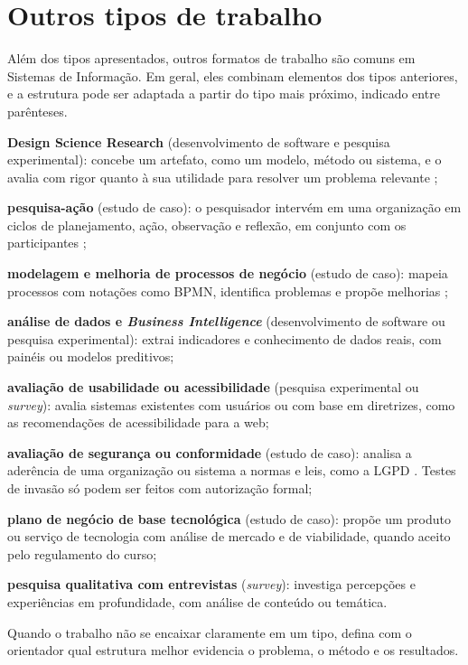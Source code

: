 \section{Outros tipos de trabalho}
\label{sec_tipo_outros}

Além dos tipos apresentados, outros formatos de trabalho são comuns em Sistemas de Informação. Em geral, eles combinam elementos dos tipos anteriores, e a estrutura pode ser adaptada a partir do tipo mais próximo, indicado entre parênteses.

\begin{alineas}
	\item \textbf{Design Science Research} (desenvolvimento de software e pesquisa experimental): concebe um artefato, como um modelo, método ou sistema, e o avalia com rigor quanto à sua utilidade para resolver um problema relevante \cite{hevner2004design};
	\item \textbf{pesquisa-ação} (estudo de caso): o pesquisador intervém em uma organização em ciclos de planejamento, ação, observação e reflexão, em conjunto com os participantes \cite{thiollent2011pesquisa};
	\item \textbf{modelagem e melhoria de processos de negócio} (estudo de caso): mapeia processos com notações como BPMN, identifica problemas e propõe melhorias \cite{dumas2018fundamentals};
	\item \textbf{análise de dados e \textit{Business Intelligence}} (desenvolvimento de software ou pesquisa experimental): extrai indicadores e conhecimento de dados reais, com painéis ou modelos preditivos;
	\item \textbf{avaliação de usabilidade ou acessibilidade} (pesquisa experimental ou \textit{survey}): avalia sistemas existentes com usuários ou com base em diretrizes, como as recomendações de acessibilidade para a web;
	\item \textbf{avaliação de segurança ou conformidade} (estudo de caso): analisa a aderência de uma organização ou sistema a normas e leis, como a LGPD \cite{brasil2018lgpd}. Testes de invasão só podem ser feitos com autorização formal;
	\item \textbf{plano de negócio de base tecnológica} (estudo de caso): propõe um produto ou serviço de tecnologia com análise de mercado e de viabilidade, quando aceito pelo regulamento do curso;
	\item \textbf{pesquisa qualitativa com entrevistas} (\textit{survey}): investiga percepções e experiências em profundidade, com análise de conteúdo ou temática.
\end{alineas}

Quando o trabalho não se encaixar claramente em um tipo, defina com o orientador qual estrutura melhor evidencia o problema, o método e os resultados.
